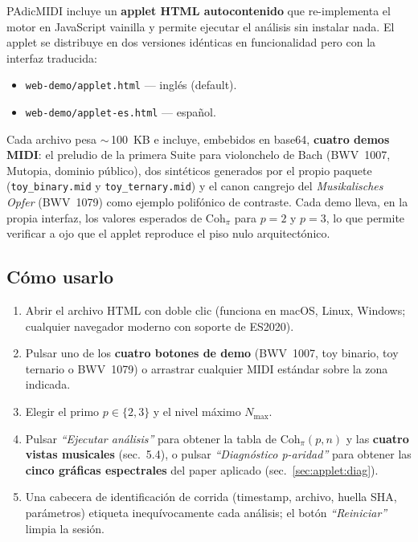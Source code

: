 \documentclass[11pt,a4paper,oneside]{article}
\theoremstyle{plain}
\theoremstyle{definition}
\theoremstyle{remark}
\newcommand{\Cohpi}{\mathrm{Coh}_\pi}
\newcommand{\file}[1]{\textcolor{accentdark}{\texttt{\small #1}}}
\begin{document}
PAdicMIDI incluye un \textbf{applet HTML autocontenido} que
re-implementa el motor en JavaScript vainilla y permite ejecutar el
análisis sin instalar nada. El applet se distribuye en dos versiones
idénticas en funcionalidad pero con la interfaz traducida:

\begin{itemize}[noitemsep]
  \item \file{web-demo/applet.html} --- inglés (default).
  \item \file{web-demo/applet-es.html} --- español.
\end{itemize}

Cada archivo pesa $\sim$\,100~KB e incluye, embebidos en base64,
\textbf{cuatro demos MIDI}: el preludio de la primera Suite para
violonchelo de Bach (BWV~1007, Mutopia, dominio público), dos
sintéticos generados por el propio paquete (\file{toy\_binary.mid}
y \file{toy\_ternary.mid}) y el canon cangrejo del
\emph{Musikalisches Opfer} (BWV~1079) como ejemplo polifónico de
contraste. Cada demo lleva, en la propia interfaz, los valores
esperados de $\Cohpi$ para $p=2$ y $p=3$, lo que permite verificar a
ojo que el applet reproduce el piso nulo arquitectónico.

\subsection{Cómo usarlo}

\begin{enumerate}[itemsep=2pt]
  \item Abrir el archivo HTML con doble clic (funciona en macOS, Linux,
        Windows; cualquier navegador moderno con soporte de ES2020).
  \item Pulsar uno de los \textbf{cuatro botones de demo} (BWV~1007,
        toy binario, toy ternario o BWV~1079) o arrastrar cualquier
        MIDI estándar sobre la zona indicada.
  \item Elegir el primo $p \in \{2, 3\}$ y el nivel máximo $N_{\max}$.
  \item Pulsar \emph{``Ejecutar análisis''} para obtener la tabla de
        $\Cohpi(p,n)$ y las \textbf{cuatro vistas musicales}
        (sec.~5.4), o pulsar \emph{``Diagnóstico p-aridad''} para
        obtener las \textbf{cinco gráficas espectrales} del paper
        aplicado (sec.~\ref{sec:applet:diag}).
  \item Una cabecera de identificación de corrida (timestamp, archivo,
        huella SHA, parámetros) etiqueta inequívocamente cada
        análisis; el botón \emph{``Reiniciar''} limpia la sesión.
\end{enumerate}
\end{document}
